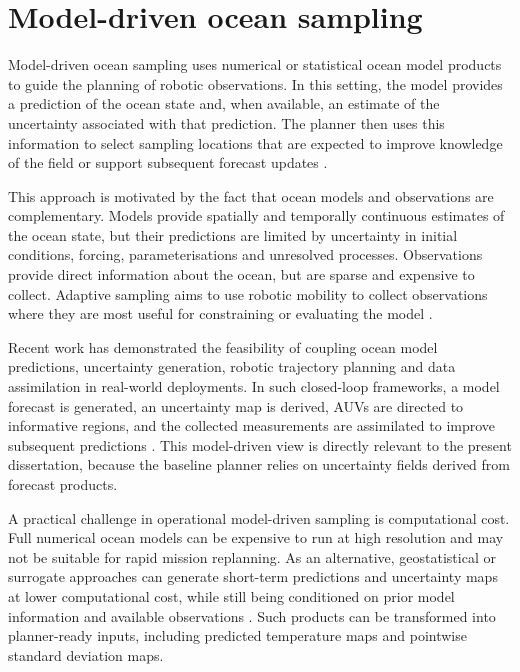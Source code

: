 \section{Model-driven ocean sampling} \label{sec:rw_model_driven_sampling}

Model-driven ocean sampling uses numerical or statistical ocean model products to guide the planning of robotic observations. In this setting, the model provides a prediction of the ocean state and, when available, an estimate of the uncertainty associated with that prediction. The planner then uses this information to select sampling locations that are expected to improve knowledge of the field or support subsequent forecast updates \parencite{lermusiaux2007adaptive,curtin2009aosn}.

This approach is motivated by the fact that ocean models and observations are complementary. Models provide spatially and temporally continuous estimates of the ocean state, but their predictions are limited by uncertainty in initial conditions, forcing, parameterisations and unresolved processes. Observations provide direct information about the ocean, but are sparse and expensive to collect. Adaptive sampling aims to use robotic mobility to collect observations where they are most useful for constraining or evaluating the model \parencite{dowd2014dataassimilation,wunsch2007stateestimation}.

Recent work has demonstrated the feasibility of coupling ocean model predictions, uncertainty generation, robotic trajectory planning and data assimilation in real-world deployments. In such closed-loop frameworks, a model forecast is generated, an uncertainty map is derived, AUVs are directed to informative regions, and the collected measurements are assimilated to improve subsequent predictions \parencite{bernacchi2025closingloop,mendes2025oceanmodeldriven}. This model-driven view is directly relevant to the present dissertation, because the baseline planner relies on uncertainty fields derived from forecast products.

A practical challenge in operational model-driven sampling is computational cost. Full numerical ocean models can be expensive to run at high resolution and may not be suitable for rapid mission replanning. As an alternative, geostatistical or surrogate approaches can generate short-term predictions and uncertainty maps at lower computational cost, while still being conditioned on prior model information and available observations \parencite{duarte2025geostatistical,mendes2025oceanmodeldriven}. Such products can be transformed into planner-ready inputs, including predicted temperature maps and pointwise standard deviation maps.


